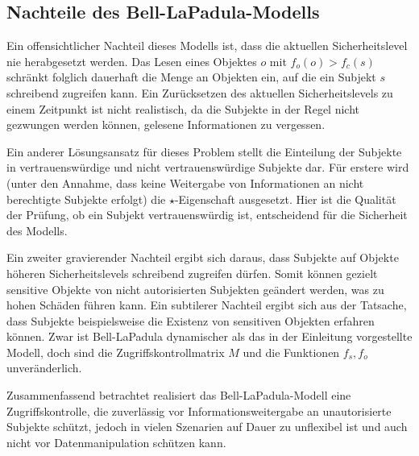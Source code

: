 \subsection{Nachteile des Bell-LaPadula-Modells}\indexBellLaPadula
Ein offensichtlicher Nachteil dieses Modells ist, dass die aktuellen
Sicherheitslevel nie herabgesetzt werden. Das Lesen eines Objektes \(o\)
mit \(f_o(o) > f_c(s)\) schränkt folglich dauerhaft die Menge an
Objekten ein, auf die ein Subjekt \(s\) schreibend zugreifen kann. Ein
Zurücksetzen des aktuellen Sicherheitslevels zu einem Zeitpunkt ist
nicht realistisch, da die Subjekte in der Regel nicht gezwungen werden
können, gelesene Informationen zu vergessen.

Ein anderer Lösungsansatz für dieses Problem stellt die Einteilung der
Subjekte in vertrauenswürdige und nicht vertrauenswürdige Subjekte
dar. Für erstere wird (unter den Annahme, dass keine Weitergabe von
Informationen an nicht berechtigte Subjekte erfolgt) die
\(\star\)-Eigenschaft ausgesetzt. Hier ist die Qualität der Prüfung, ob
ein Subjekt vertrauenswürdig ist, entscheidend für die
Sicherheit des Modells.

Ein zweiter gravierender Nachteil ergibt sich daraus, dass Subjekte auf
Objekte höheren Sicherheitslevels schreibend zugreifen dürfen. Somit
können gezielt sensitive Objekte von nicht autorisierten Subjekten
geändert werden, was zu hohen Schäden führen kann.  Ein subtilerer
Nachteil ergibt sich aus der Tatsache, dass Subjekte beispielsweise die
Existenz von sensitiven Objekten erfahren können. Zwar %
ist Bell-LaPadula dynamischer als das in der Einleitung vorgestellte
Modell, doch sind die Zugriffskontrollmatrix \(M\) und die Funktionen
\(f_s, f_o\) unveränderlich.

Zusammenfassend betrachtet realisiert das Bell-LaPadula-Modell eine
Zugriffskontrolle, die zuverlässig vor Informationsweitergabe an
unautorisierte Subjekte schützt, jedoch in vielen Szenarien auf Dauer zu
unflexibel ist und auch nicht vor Datenmanipulation schützen kann.

